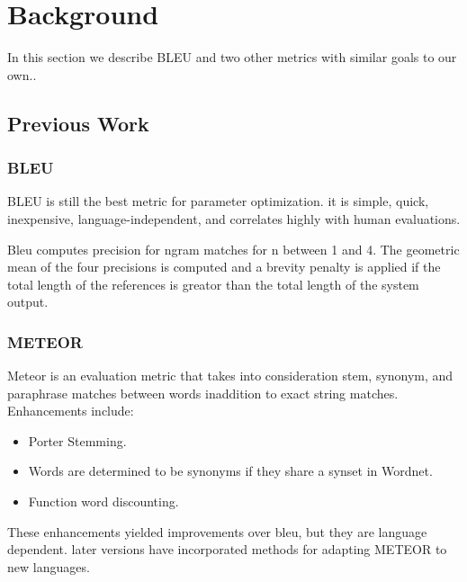 
\section{Background}
\label{sec:background}

In this section we describe BLEU and two other metrics with similar goals to our own.. 

\subsection{Previous Work}
\label{sec:prevwork}


\subsubsection{BLEU}
\label{sec:bleu}


BLEU is still the best metric for parameter optimization\cite{Cer:2010:BLM:1857999.1858079}. 
it is simple, quick, inexpensive, language-independent, and correlates highly with human evaluations. 


Bleu computes precision for ngram matches for n between 1 and 4. 
The geometric mean of the four precisions is computed and a brevity penalty is applied if the total length of the references is greator than the total length of the system output. 

\subsubsection{METEOR}
\label{sec:meteor}


Meteor is an evaluation metric that takes into consideration stem, synonym, and paraphrase matches between words inaddition to exact string matches.
Enhancements include:
\begin{itemize}
\item 
Porter Stemming.
\item 
Words  are determined to  be synonyms if they share a synset in Wordnet.
\item 
Function word discounting.
\end{itemize}

These enhancements yielded improvements over bleu, but they are language dependent. 
later versions have incorporated methods for adapting METEOR to new languages. 


